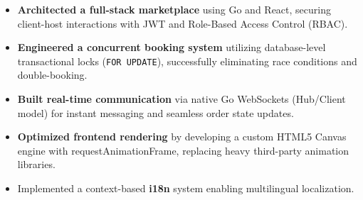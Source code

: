 \begin{itemize}
  \item \textbf{Architected a full-stack marketplace} using Go and React, securing client-host interactions with JWT and Role-Based Access Control (RBAC).
  \item \textbf{Engineered a concurrent booking system} utilizing database-level transactional locks (\texttt{FOR UPDATE}), successfully eliminating race conditions and double-booking.
  \item \textbf{Built real-time communication} via native Go WebSockets (Hub/Client model) for instant messaging and seamless order state updates.
  \item \textbf{Optimized frontend rendering} by developing a custom HTML5 Canvas engine with requestAnimationFrame, replacing heavy third-party animation libraries.
  \item Implemented a context-based \textbf{i18n} system enabling multilingual localization.
\end{itemize}